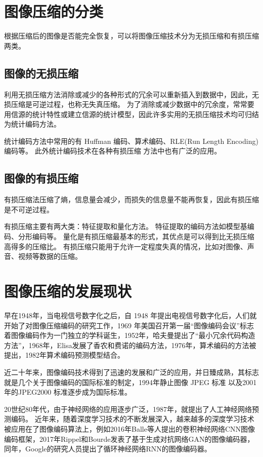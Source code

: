 \section{图像压缩的分类}
根据压缩后的图像是否能完全恢复，可以将图像压缩技术分为无损压缩和有损压缩两类。
\subsection{图像的无损压缩}

利用无损压缩方法消除或减少的各种形式的冗余可以重新插入到数据中，因此，无损压缩是可逆过程，也称无失真压缩。
为了消除或减少数据中的冗余度，常常要用信源的统计特性或建立信源的统计模型，因此许多实用的无损压缩技术均可归结为统计编码方法。

统计编码方法中常用的有 Huffman 编码、算术编码、RLE(Run Length Encoding)编码等。 此外统计编码技术在各种有损压缩 方法中也有广泛的应用。

\subsection{图像的有损压缩}

有损压缩法压缩了熵，信息量会减少，而损失的信息量不能再恢复，因此有损压缩是不可逆过程。

有损压缩主要有两大类：特征提取和量化方法。
特征提取的编码方法如模型基编码、分形编码等。
量化是有损压缩最基本的形式，其优点是可以得到比无损压缩高得多的压缩比。
有损压缩只能用于允许一定程度失真的情况，比如对图像、声音、视频等数据的压缩。


\section{图像压缩的发展现状}

早在1948年，当电视信号数字化之后，自 1948 年提出电视信号数字化后，人们就开始了对图像压缩编码的研究工作，1969 年美国召开第一届“图像编码会议”标志着图像编码作为一门独立的学科诞生，1952年，哈夫曼提出了“最小冗余代码构造方法”\cite{最小冗余代码构造方法}，1968年，Elisa发展了香农和费诺的编码方法\cite{elias1955coding}，1976年，算术编码的方法\cite{rissanen1976generalized}被提出，1982年算术编码预测模型结合。


近二十年来，图像编码技术得到了迅速的发展和广泛的应用，并日臻成熟，其标志就是几个关于图像编码的国际标准的制定，1994年静止图像 JPEG 标准\cite{wallace1992jpeg} 以及2001年的JPEG2000 标准\cite{rabbani2002jpeg2000}逐步成为国际标准。


20世纪80年代，由于神经网络的应用逐步广泛，1987年，就提出了人工神经网络预测编码。
近年来，随着深度学习技术的不断发展深入，越来越多的深度学习技术被应用在了图像编码算法上，例如2016年Balle等人提出的卷积神经网络CNN图像编码框架\cite{balle2016end}，2017年Rippel和Bourde发表了基于生成对抗网络GAN的图像编码器\cite{rippel2017real}，同年，Google的研究人员提出了循环神经网络RNN的图像编码器\cite{toderici2017full}。

